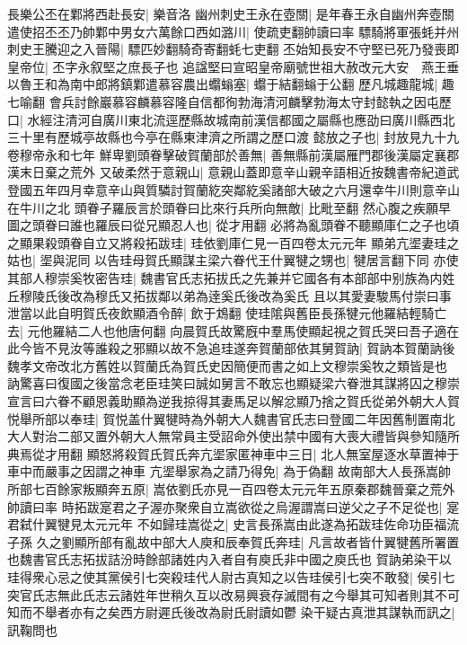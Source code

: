 長樂公丕在鄴將西赴長安|{
	樂音洛}
幽州刺史王永在壺關|{
	是年春王永自幽州奔壺關}
遣使招丕丕乃帥鄴中男女六萬餘口西如潞川|{
	使疏吏翻帥讀曰率}
驃騎將軍張蚝并州刺史王騰迎之入晉陽|{
	驃匹妙翻騎奇寄翻蚝七吏翻}
丕始知長安不守堅已死乃發喪即皇帝位|{
	丕字永叙堅之庶長子也}
追諡堅曰宣昭皇帝廟號世祖大赦改元大安　燕王垂以魯王和為南中郎將鎮鄴遣慕容農出蠮螉塞|{
	蠮于結翻螉于公翻}
歷凡城趣龍城|{
	趣七喻翻}
會兵討餘巖慕容麟慕容隆自信都徇勃海清河麟擊勃海太守封懿執之因屯歷口|{
	水經注清河自廣川東北流逕歷縣故城南前漢信都國之屬縣也應劭曰廣川縣西北三十里有歷城亭故縣也今亭在縣東津濟之所謂之歷口渡}
懿放之子也|{
	封放見九十九卷穆帝永和七年}
鮮卑劉頭眷擊破賀蘭部於善無|{
	善無縣前漢屬雁門郡後漢屬定襄郡漢末日棄之荒外}
又破柔然于意親山|{
	意親山蓋即意辛山親辛語相近按魏書帝紀道武登國五年四月幸意辛山與質驎討賀蘭紇突鄰紇奚諸部大破之六月還幸牛川則意辛山在牛川之北}
頭眷子羅辰言於頭眷曰比來行兵所向無敵|{
	比毗至翻}
然心腹之疾願早圖之頭眷曰誰也羅辰曰從兄顯忍人也|{
	從才用翻}
必將為亂頭眷不聽顯庫仁之子也頃之顯果殺頭眷自立又將殺拓跋珪|{
	珪依劉庫仁見一百四卷太元元年}
顯弟亢埿妻珪之姑也|{
	埿與泥同}
以告珪母賀氏顯謀主梁六眷代王什翼犍之甥也|{
	犍居言翻下同}
亦使其部人穆崇奚牧密告珪|{
	魏書官氏志拓拔氏之先兼并它國各有本部部中别族為内姓丘穆陵氏後改為穆氏又拓拔鄰以弟為逹奚氏後改為奚氏}
且以其愛妻駿馬付崇曰事泄當以此自明賀氏夜飲顯酒令醉|{
	飲于鴆翻}
使珪隂與舊臣長孫犍元他羅結輕騎亡去|{
	元他羅結二人也他唐何翻}
向晨賀氏故驚廐中羣馬使顯起視之賀氏哭曰吾子適在此今皆不見汝等誰殺之邪顯以故不急追珪遂奔賀蘭部依其舅賀訥|{
	賀訥本賀蘭訥後魏孝文帝改北方舊姓以賀蘭氏為賀氏史因簡便而書之如上文穆崇奚牧之類皆是也}
訥驚喜曰復國之後當念老臣珪笑曰誠如舅言不敢忘也顯疑梁六眷泄其謀將囚之穆崇宣言曰六眷不顧恩義助顯為逆我掠得其妻馬足以解忿顯乃捨之賀氏從弟外朝大人賀悦舉所部以奉珪|{
	賀悦盖什翼犍時為外朝大人魏書官氏志曰登國二年因舊制置南北大人對治二部又置外朝大人無常員主受詔命外使出禁中國有大喪大禮皆與參知隨所典焉從才用翻}
顯怒將殺賀氏賀氏奔亢埿家匿神車中三日|{
	北人無室屋逐水草置神于車中而嚴事之因謂之神車}
亢埿舉家為之請乃得免|{
	為于偽翻}
故南部大人長孫嵩帥所部七百餘家叛顯奔五原|{
	嵩依劉氏亦見一百四卷太元元年五原秦郡魏晉棄之荒外帥讀曰率}
時拓跋寔君之子渥亦聚衆自立嵩欲從之烏渥謂嵩曰逆父之子不足從也|{
	寔君弑什翼犍見太元元年}
不如歸珪嵩從之|{
	史言長孫嵩由此遂為拓跋珪佐命功臣福流子孫}
久之劉顯所部有亂故中部大人庾和辰奉賀氏奔珪|{
	凡言故者皆什翼犍舊所署置也魏書官氏志拓拔詰汾時餘部諸姓内入者自有庾氏非中國之庾氏也}
賀訥弟染干以珪得衆心忌之使其黨侯引七突殺珪代人尉古真知之以告珪侯引七突不敢發|{
	侯引七突官氏志無此氏志云諸姓年世稍久互以改易興衰存滅間有之今舉其可知者則其不可知而不舉者亦有之矣西方尉遲氏後改為尉氏尉讀如鬱}
染干疑古真泄其謀執而訊之|{
	訊鞠問也}
